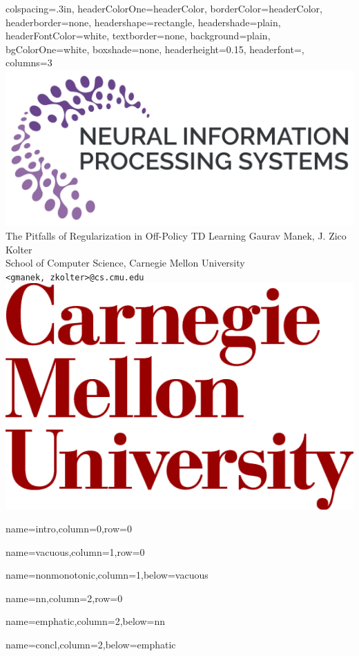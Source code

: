 \documentclass[landscape,paperwidth=96in,paperheight=42in,fontscale=0.2,margin=1.5in]{baposter}
\begin{document}
\begin{poster}{
    colspacing=.3in,
    headerColorOne=headerColor, borderColor=headerColor,
    headerborder=none, headershape=rectangle,
    headershade=plain, headerFontColor=white, textborder=none,
    background=plain, bgColorOne=white, boxshade=none,
    headerheight=0.15\textheight,
    headerfont=\headerfont,
    columns=3
  }{
    \includegraphics[height=0.11\textheight]{images/neurips-logo}
  }{
    {{\titlefont The Pitfalls of Regularization in Off-Policy TD Learning }}
  }{\vspace{2mm}\large
    Gaurav Manek, J. Zico Kolter \\
    School of Computer Science, Carnegie Mellon University \\
    \texttt{<gmanek, zkolter>@cs.cmu.edu}
  }{\includegraphics[height=0.11\textheight]{images/cmu-logo}}

  {name=intro,column=0,row=0}{}

  {name=vacuous,column=1,row=0}{}

  {name=nonmonotonic,column=1,below=vacuous}{}

  {name=nn,column=2,row=0}{}

  {name=emphatic,column=2,below=nn}{}

  {name=concl,column=2,below=emphatic}{}


\end{poster}
\end{document}
